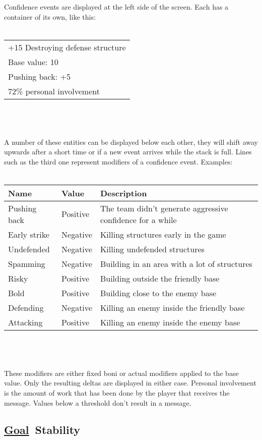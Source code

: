 \documentclass{scrartcl}
\newcommand{\goal}     [0]{\textbf{\underline{Goal}\ }}
\begin{document}
Confidence events are displayed at the left side of the screen. Each has a container of its own, like this:
\\\\
\begin{tabular}{l}
\hline
+15 Destroying defense structure\\
Base value: 10\\
Pushing back: +5\\
72\% personal involvement\\
\hline
\end{tabular}
\\\\\\
A number of these entities can be displayed below each other, they will shift away upwards after a short time or if a new event arrives while the stack is full. Lines such as the third one represent modifiers of a confidence event. Examples:
\\\\
\begin{tabular}{l|l|l}
	Name         & Value    & Description\\
	\hline
	Pushing back & Positive & The team didn't generate aggressive confidence for a while\\
	Early strike & Negative & Killing structures early in the game\\
	Undefended   & Negative & Killing undefended structures\\
	Spamming     & Negative & Building in an area with a lot of structures\\
	Risky        & Positive & Building outside the friendly base\\
	Bold         & Positive & Building close to the enemy base\\
	Defending    & Negative & Killing an enemy inside the friendly base\\
	Attacking    & Positive & Killing an enemy inside the enemy base\\
\end{tabular}
\\\\\\
These modifiers are either fixed boni or actual modifiers applied to the base value. Only the resulting deltas are displayed in either case. Personal involvement is the amount of work that has been done by the player that receives the message. Values below a threshold don't result in a message.

\subsection{\goal Stability}
\end{document}
